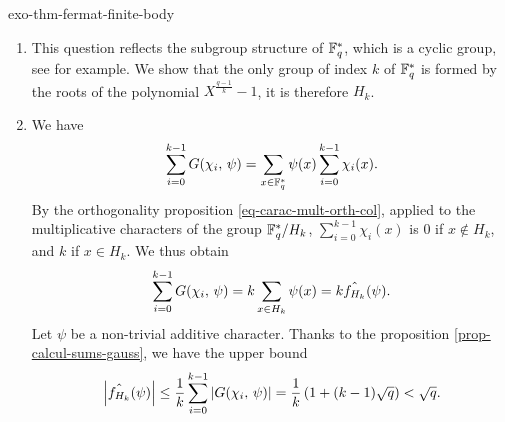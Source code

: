  
\begin{correction}{exo-thm-fermat-finite-body}
\begin{enumerate}
\item {} This question reflects the subgroup structure of $ \mathbb{F}_q^* $, which is a cyclic group, see for example{\upshape \cite{demazure}}. We show that the only group of index $ k $ of $ \mathbb{F}_q^* $ is formed by the roots of the polynomial $ X^{\frac{q-1}{k}}-1 $, it is therefore $ H_k $.
\item We have
\begin{equation*}
\sum_{i = 0}^{k-1}{G (\chi_i, \, \psi)} = \sum_{x \in \mathbb{F}_q^*}{\psi (x) \sum_{i = 0}^{k-1}{\chi_i (x)}}.
\end{equation*}
By the orthogonality proposition \ref{eq-carac-mult-orth-col}, applied to the multiplicative characters of the group $ \mathbb{F}_q^*/H_k $, $ \sum_{i = 0}^{k-1}{\chi_i (x)} $ is $ 0 $ if $ x \notin H_k $, and $ k $ if $ x \in H_k $. We thus obtain
\begin{equation*}
\sum_{i = 0}^{k-1}{G (\chi_i, \, \psi)} = k \sum_{x \in H_k}{\psi (x)} = k \hat{f_{H_k}} (\psi).
\end{equation*}
Let $ \psi $ be a non-trivial additive character. Thanks to the proposition \ref{prop-calcul-sums-gauss}, we have the upper bound
\begin{equation*}
\left| \hat{f_{H_k}} (\psi) \right| \leq \frac{1}{k} \sum_{i = 0}^{k-1}{| G (\chi_i, \, \psi) |} = \frac{1}{k} \left(1 + (k-1) \sqrt{q} \right) <\sqrt{q}.
\end{equation*}
 

\end{enumerate}
\end{correction}
